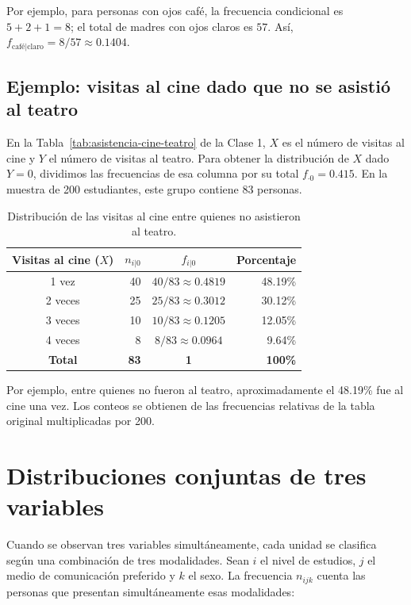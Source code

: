 Por ejemplo, para personas con ojos café, la frecuencia condicional es $5+2+1=8$; el total de madres con ojos claros es $57$. Así, $f_{\text{café}|\text{claro}}=8/57\approx0.1404$.

\subsection{Ejemplo: visitas al cine dado que no se asistió al teatro}

En la Tabla~\ref{tab:asistencia-cine-teatro} de la Clase 1, $X$ es el número de visitas al cine y $Y$ el número de visitas al teatro. Para obtener la distribución de $X$ dado $Y=0$, dividimos las frecuencias de esa columna por su total $f_{\cdot 0}=0.415$. En la muestra de 200 estudiantes, este grupo contiene 83 personas.

\begin{table}[H]
\centering
\small
\renewcommand{\arraystretch}{1.15}
\begin{tabular}{|c|r|c|r|}
\hline
\textbf{Visitas al cine ($X$)} & \textbf{$n_{i|0}$} & \textbf{$f_{i|0}$} & \textbf{Porcentaje} \\ \hline
1 vez & 40 & $40/83\approx0.4819$ & 48.19\% \\ \hline
2 veces & 25 & $25/83\approx0.3012$ & 30.12\% \\ \hline
3 veces & 10 & $10/83\approx0.1205$ & 12.05\% \\ \hline
4 veces & 8  & $8/83\approx0.0964$  & 9.64\% \\ \hline
\textbf{Total} & \textbf{83} & \textbf{1} & \textbf{100\%} \\ \hline
\end{tabular}
\caption{Distribución de las visitas al cine entre quienes no asistieron al teatro.}
\label{tab:cine-condicional-teatro-cero}
\end{table}

Por ejemplo, entre quienes no fueron al teatro, aproximadamente el 48.19\% fue al cine una vez. Los conteos se obtienen de las frecuencias relativas de la tabla original multiplicadas por 200.

\section{Distribuciones conjuntas de tres variables}

Cuando se observan tres variables simultáneamente, cada unidad se clasifica según una combinación de tres modalidades. Sean $i$ el nivel de estudios, $j$ el medio de comunicación preferido y $k$ el sexo. La frecuencia $n_{ijk}$ cuenta las personas que presentan simultáneamente esas modalidades:

